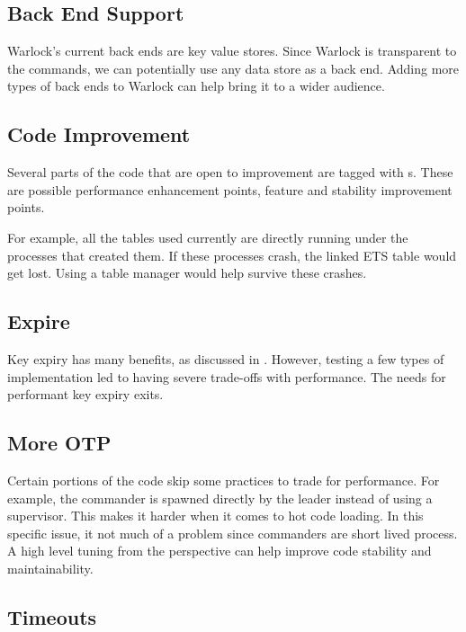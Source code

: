 \subsection{Back End Support}

Warlock's current back ends are key value stores. Since Warlock is transparent
to the commands, we can potentially use any data store as a back end. Adding
more types of back ends to Warlock can help bring it to a wider audience.

\subsection{Code Improvement}

Several parts of the code that are open to improvement are tagged with
s. These are possible performance enhancement points, feature and
stability improvement points.

For example, all the  tables used currently
are directly running under the processes that created them. If these processes
crash, the linked ETS table would get lost. Using a table manager would
help survive these crashes.

\subsection{Expire}

Key expiry has many benefits, as discussed in .
However, testing a few types of implementation led to having severe trade-offs
with performance. The needs for performant key expiry exits.

\subsection{More OTP}

Certain portions of the code skip some  practices to trade for
performance.
For example, the commander is spawned directly by the leader instead of using
a supervisor. This makes it harder when it comes to hot code loading. In this
specific issue, it not much of a problem since commanders are short lived
process. A high level tuning from the  perspective can help improve
code stability and maintainability.

\subsection{Timeouts}

